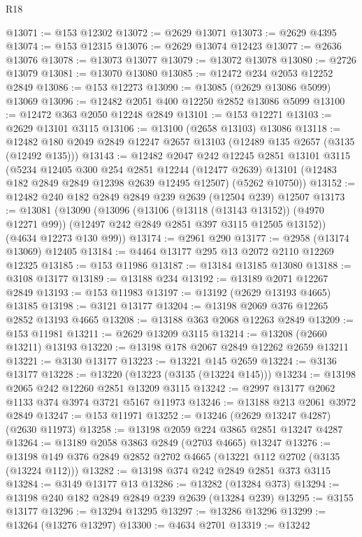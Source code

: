 \begin{lexlean}{R18}
\begin{coremodule}
@13071 := @153 @12302
@13072 := @2629 @13071
@13073 := @2629 @4395
@13074 := @153 @12315
@13076 := @2629 @13074 @12423
@13077 := @2636 @13076
@13078 := @13073 @13077
@13079 := @13072 @13078
@13080 := @2726 @13079
@13081 := @13070 @13080
@13085 := @12472 @234 @2053 @12252 @2849
@13086 := @153 @12273
@13090 := @13085 (@2629 @13086 @5099) @13069
@13096 := @12482 @2051 @400 @12250 @2852 @13086 @5099
@13100 := @12472 @363 @2050 @12248 @2849
@13101 := @153 @12271
@13103 := @2629 @13101 @3115
@13106 := @13100 (@2658 @13103) @13086
@13118 := @12482 @180 @2049 @2849 @12247 @2657 @13103 (@12489 @135 @2657 (@3135 (@12492 @135)))
@13143 := @12482
    @2047
    @242
    @12245
    @2851
    @13101
    @3115
    (@5234
      @12405
      @300
      @254
      @2851
      @12244
      (@12477 @2639)
      @13101
      (@12483 @182 @2849 @2849 @12398 @2639 @12495 @12507)
      (@5262 @10750))
@13152 := @12482 @240 @182 @2849 @2849 @239 @2639 (@12504 @239) @12507
@13173 := @13081
    (@13090
      (@13096
        (@13106 (@13118 (@13143 @13152)) (@4970 @12271 @99))
        (@12497 @242 @2849 @2851 @397 @3115 @12505 @13152))
      (@4634 @12273 @130 @99))
@13174 := @2961 @290
@13177 := @2958 (@13174 @13069) @12405
@13184 := @4464 @13177 @295 @13 @2072 @2110 @12269 @12325
@13185 := @153 @11986
@13187 := @13184 @13185 @13080
@13188 := @3108 @13177
@13189 := @13188 @234
@13192 := @13189 @2071 @12267 @2849
@13193 := @153 @11983
@13197 := @13192 (@2629 @13193 @4665) @13185
@13198 := @3121 @13177
@13204 := @13198 @2069 @376 @12265 @2852 @13193 @4665
@13208 := @13188 @363 @2068 @12263 @2849
@13209 := @153 @11981
@13211 := @2629 @13209 @3115
@13214 := @13208 (@2660 @13211) @13193
@13220 := @13198 @178 @2067 @2849 @12262 @2659 @13211
@13221 := @3130 @13177
@13223 := @13221 @145 @2659
@13224 := @3136 @13177
@13228 := @13220 (@13223 (@3135 (@13224 @145)))
@13234 := @13198 @2065 @242 @12260 @2851 @13209 @3115
@13242 := @2997 @13177 @2062 @1133 @374 @3974 @3721 @5167 @11973
@13246 := @13188 @213 @2061 @3972 @2849
@13247 := @153 @11971
@13252 := @13246 (@2629 @13247 @4287) (@2630 @11973)
@13258 := @13198 @2059 @224 @3865 @2851 @13247 @4287
@13264 := @13189 @2058 @3863 @2849 (@2703 @4665) @13247
@13276 := @13198 @149 @376 @2849 @2852 @2702 @4665 (@13221 @112 @2702 (@3135 (@13224 @112)))
@13282 := @13198 @374 @242 @2849 @2851 @373 @3115
@13284 := @3149 @13177 @13
@13286 := @13282 (@13284 @373)
@13294 := @13198 @240 @182 @2849 @2849 @239 @2639 (@13284 @239)
@13295 := @3155 @13177
@13296 := @13294 @13295
@13297 := @13286 @13296
@13299 := @13264 (@13276 @13297)
@13300 := @4634 @2701
@13319 := @13242

\end{coremodule}
\end{lexlean}
